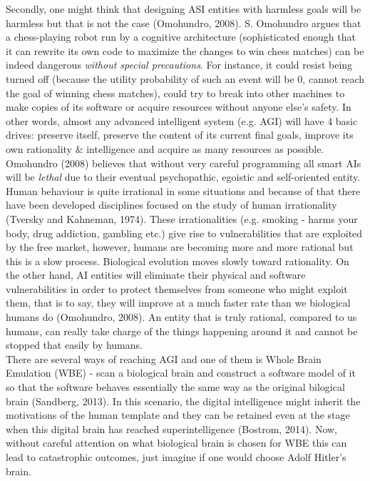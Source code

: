 \documentclass[11pt]{article}
\begin{document}
	\indent
	Secondly, one might think that designing ASI entities with harmless goals will be harmless but that is not the case (Omohundro, 2008).
S. Omohundro argues that a chess-playing robot run by a cognitive architecture (sophisticated enough that it can rewrite its own code to maximize the changes to win chess matches) can be indeed dangerous \textit{without special precautions}. For instance, it could resist being turned off (because the utility probability of such an event will be 0, cannot reach the goal of winning chess matches), could try to break into other machines to make copies of its software  or acquire resources without anyone else's safety. In other words, almost any advanced intelligent system (e.g. AGI) will have 4 basic drives: preserve itself, preserve the content of its current final goals, improve its own rationality \& intelligence and acquire as many resources as possible. Omohundro (2008) believes that without very careful programming all smart AIs will be \textit{lethal} due to their eventual psychopathic, egoistic and self-oriented entity.\\


	\indent
	Human behaviour is quite irrational in some situations and because of that there have been developed disciplines focused on the study of human irrationality (Tversky and Kahneman, 1974). These irrationalities (e.g. smoking - harms your body, drug addiction, gambling etc.) give rise to vulnerabilities that are exploited by the free market, however, humans are becoming more and more rational but this is a slow process. Biological evolution moves slowly toward rationality. On the other hand, AI entities will eliminate their physical  and software vulnerabilities in order to protect themselves from someone who might exploit them, that is to say, they will  improve at a much faster rate than we biological humans do (Omohundro, 2008). An entity that is truly rational, compared to us humans, can really take charge of the things happening around it and cannot be stopped that easily by humans.\\

	\indent
	There are several ways of reaching AGI and one of them is Whole Brain Emulation (WBE) - scan a biological brain and construct a software model of it so that the software behaves essentially the same way as the original bilogical brain (Sandberg, 2013). In this scenario, the digital intelligence might inherit the motivations of the human template and they can be retained even at the stage when this digital brain has reached superintelligence (Bostrom, 2014). Now, without careful attention on what biological brain is chosen for WBE this can lead to catastrophic outcomes, just imagine if one would choose Adolf Hitler's brain. \\
 
\end{document}

